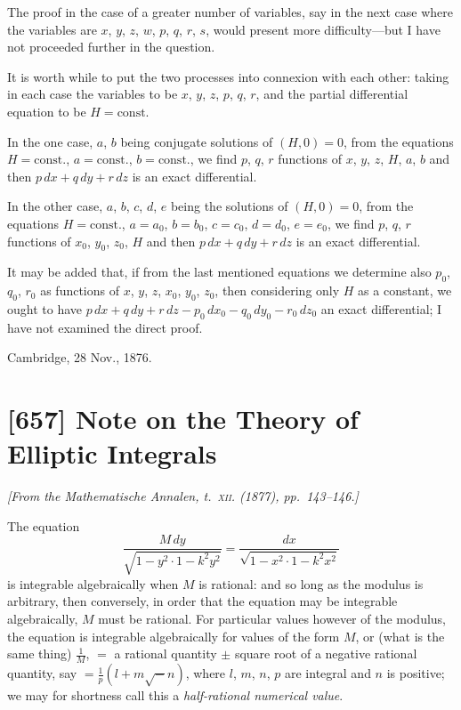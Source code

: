 \documentclass[11pt,a4paper]{article}
\theoremstyle{plain}
\theoremstyle{definition}
\begin{document}
The proof in the case of a greater number of variables, say in the next case where the variables are $x$, $y$, $z$, $w$, $p$, $q$, $r$, $s$, would present more difficulty---but I have not proceeded further in the question.

It is worth while to put the two processes into connexion with each other: taking in each case the variables to be $x$, $y$, $z$, $p$, $q$, $r$, and the partial differential equation to be $H = \text{const.}$

In the one case, $a$, $b$ being conjugate solutions of $(H, 0) = 0$, from the equations $H = \text{const.}$, $a = \text{const.}$, $b = \text{const.}$, we find $p$, $q$, $r$ functions of $x$, $y$, $z$, $H$, $a$, $b$ and then $p\,dx + q\,dy + r\,dz$ is an exact differential.

In the other case, $a$, $b$, $c$, $d$, $e$ being the solutions of $(H, 0) = 0$, from the equations $H = \text{const.}$, $a = a_0$, $b = b_0$, $c = c_0$, $d = d_0$, $e = e_0$, we find $p$, $q$, $r$ functions of $x_0$, $y_0$, $z_0$, $H$ and then $p\,dx + q\,dy + r\,dz$ is an exact differential.

It may be added that, if from the last mentioned equations we determine also $p_0$, $q_0$, $r_0$ as functions of $x$, $y$, $z$, $x_0$, $y_0$, $z_0$, then considering only $H$ as a constant, we ought to have $p\,dx + q\,dy + r\,dz - p_0\,dx_0 - q_0\,dy_0 - r_0\,dz_0$ an exact differential; I have not examined the direct proof.

\begin{flushright}
Cambridge, 28 Nov., 1876.
\end{flushright}

\newpage
\section{[657] Note on the Theory of Elliptic Integrals}
\label{sec:657}

\noindent\textit{[From the \emph{Mathematische Annalen}, t.~\textsc{xii}. (1877), pp.~143--146.]}

\medskip

The equation
\[
\frac{M\,dy}{\sqrt{1 - y^2 \cdot 1 - k^2 y^2}} = \frac{dx}{\sqrt{1 - x^2 \cdot 1 - k^2 x^2}}
\]
is integrable algebraically when $M$ is rational: and so long as the modulus is arbitrary, then conversely, in order that the equation may be integrable algebraically, $M$ must be rational. For particular values however of the modulus, the equation is integrable algebraically for values of the form $M$, or (what is the same thing) $\frac{1}{M}$, $=$ a rational quantity $\pm$ square root of a negative rational quantity, say $= \frac{1}{p}(l + m\surd -n)$, where $l$, $m$, $n$, $p$ are integral and $n$ is positive; we may for shortness call this a \emph{half-rational numerical value}.
\end{document}
